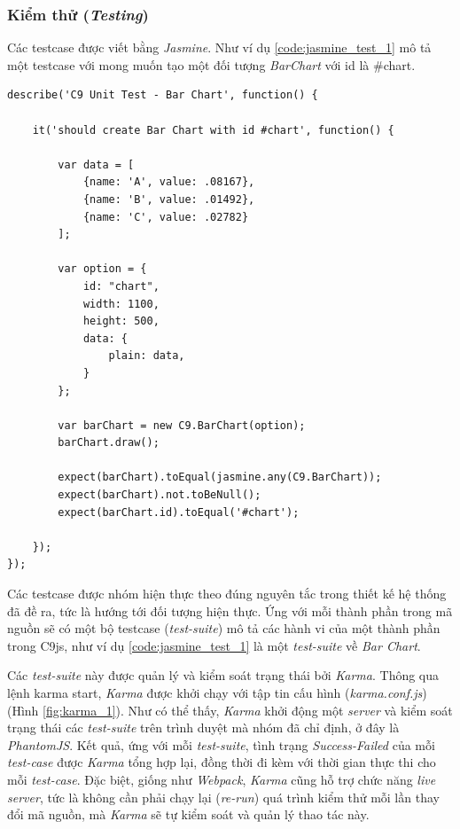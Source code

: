 \documentclass[12pt,a4paper]{article}
\begin{document}
\subsubsection{Kiểm thử (\textit{Testing})}

Các testcase được viết bằng \textit{Jasmine}. Như ví dụ \ref{code:jasmine_test_1} mô tả một testcase với mong muốn tạo một đối tượng \textit{BarChart} với id là \textsf{\#chart}.

\begin{lstlisting}[caption=Một testcase trong C9js được viết bằng Jasmine,label={code:jasmine_test_1}]
describe('C9 Unit Test - Bar Chart', function() {

    it('should create Bar Chart with id #chart', function() {

        var data = [
            {name: 'A', value: .08167},
            {name: 'B', value: .01492},
            {name: 'C', value: .02782}
        ];

        var option = {
            id: "chart", 
            width: 1100, 
            height: 500,
            data: {
                plain: data,
            }
        };

        var barChart = new C9.BarChart(option);
        barChart.draw();

        expect(barChart).toEqual(jasmine.any(C9.BarChart));
        expect(barChart).not.toBeNull();
        expect(barChart.id).toEqual('#chart');

    });
});
\end{lstlisting}

Các testcase được nhóm hiện thực theo đúng nguyên tắc trong thiết kế hệ thống đã đề ra, tức là hướng tới đối tượng hiện thực. Ứng với mỗi thành phần trong mã nguồn sẽ có một bộ testcase (\textit{test-suite}) mô tả các hành vi của một thành phần trong C9js, như ví dụ \ref{code:jasmine_test_1} là một \textit{test-suite} về \textit{Bar Chart}.

Các \textit{test-suite} này được quản lý và kiểm soát trạng thái bởi \textit{Karma}. Thông qua lệnh \textsf{karma start}, \textit{Karma} được khởi chạy với tập tin cấu hình (\textit{karma.conf.js}) (Hình \ref{fig:karma_1}). Như có thể thấy, \textit{Karma} khởi động một \textit{server} và kiểm soát trạng thái các \textit{test-suite} trên trình duyệt mà nhóm đã chỉ định, ở đây là \textit{PhantomJS}. Kết quả, ứng với mỗi \textit{test-suite}, tình trạng \textit{Success-Failed} của mỗi \textit{test-case} được \textit{Karma} tổng hợp lại, đồng thời đi kèm với thời gian thực thi cho mỗi \textit{test-case}. Đặc biệt, giống như \textit{Webpack}, \textit{Karma} cũng hỗ trợ chức năng \textit{live server}, tức là không cần phải chạy lại (\textit{re-run}) quá trình kiểm thử mỗi lần thay đổi mã nguồn, mà \textit{Karma} sẽ tự kiểm soát và quản lý thao tác này.
\end{document}
